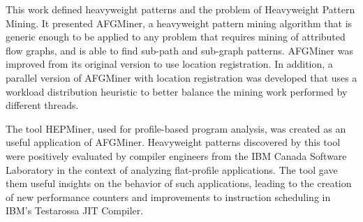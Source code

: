 This work defined heavyweight patterns and the problem of Heavyweight Pattern Mining. It presented AFGMiner, a heavyweight pattern mining algorithm that is generic enough to be applied to any problem that requires mining of attributed flow graphs, and is able
to find sub-path and sub-graph patterns. AFGMiner was improved from its original version to use location registration. In addition, a parallel version of AFGMiner with location registration was developed that uses a workload distribution heuristic to better balance the mining work performed by different threads.

The tool HEPMiner, used for profile-based program analysis, was created as an useful application of AFGMiner. Heavyweight patterns discovered by this tool were positively evaluated by compiler engineers from the IBM Canada Software Laboratory in the context of analyzing flat-profile applications. The tool gave them useful insights on the behavior of such applications, leading to the creation of new performance counters and improvements to instruction scheduling in IBM's Testarossa JIT Compiler.

